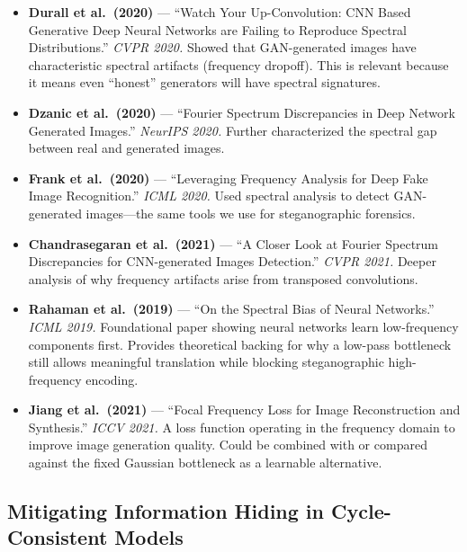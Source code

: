 \documentclass[11pt,a4paper]{article}
\theoremstyle{definition}
\begin{document}
\begin{itemize}
    \item \textbf{Durall et al.\ (2020)} --- ``Watch Your Up-Convolution: CNN Based Generative Deep Neural Networks are Failing to Reproduce Spectral Distributions.'' \textit{CVPR 2020.} Showed that GAN-generated images have characteristic spectral artifacts (frequency dropoff). This is relevant because it means even ``honest'' generators will have spectral signatures.

    \item \textbf{Dzanic et al.\ (2020)} --- ``Fourier Spectrum Discrepancies in Deep Network Generated Images.'' \textit{NeurIPS 2020.} Further characterized the spectral gap between real and generated images.

    \item \textbf{Frank et al.\ (2020)} --- ``Leveraging Frequency Analysis for Deep Fake Image Recognition.'' \textit{ICML 2020.} Used spectral analysis to detect GAN-generated images---the same tools we use for steganographic forensics.

    \item \textbf{Chandrasegaran et al.\ (2021)} --- ``A Closer Look at Fourier Spectrum Discrepancies for CNN-generated Images Detection.'' \textit{CVPR 2021.} Deeper analysis of why frequency artifacts arise from transposed convolutions.

    \item \textbf{Rahaman et al.\ (2019)} --- ``On the Spectral Bias of Neural Networks.'' \textit{ICML 2019.} Foundational paper showing neural networks learn low-frequency components first. Provides theoretical backing for why a low-pass bottleneck still allows meaningful translation while blocking steganographic high-frequency encoding.

    \item \textbf{Jiang et al.\ (2021)} --- ``Focal Frequency Loss for Image Reconstruction and Synthesis.'' \textit{ICCV 2021.} A loss function operating in the frequency domain to improve image generation quality. Could be combined with or compared against the fixed Gaussian bottleneck as a learnable alternative.
\end{itemize}

\subsection{Mitigating Information Hiding in Cycle-Consistent Models}
\end{document}
